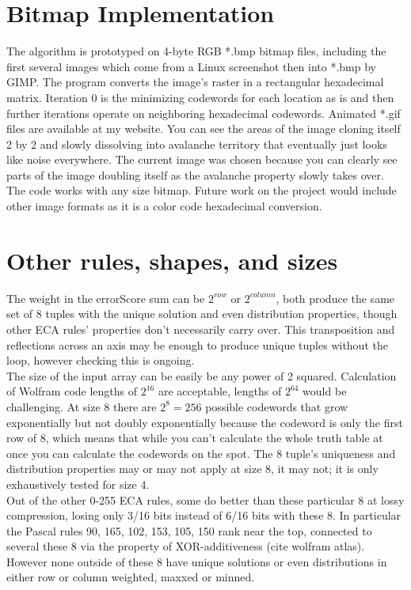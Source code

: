 \documentclass[11pt]{article}
\begin{document}
\section{Bitmap Implementation}

The algorithm is prototyped on 4-byte RGB *.bmp bitmap files, including the first several images which come from a Linux screenshot then into *.bmp by GIMP. The program converts the image's raster in a rectangular hexadecimal matrix. Iteration 0 is the minimizing codewords for each location as is and then further iterations operate on neighboring hexadecimal codewords. Animated *.gif files are available at my website. You can see the areas of the image cloning itself 2 by 2 and slowly dissolving into avalanche territory that eventually just looks like noise everywhere. The current image was chosen because you can clearly see parts of the image doubling itself as the avalanche property slowly takes over. The code works with any size bitmap. Future work on the project would include other image formats as it is a color code hexadecimal conversion. 

\section{Other rules, shapes, and sizes}

The weight in the errorScore sum can be $2^{row}$ or $2^{column}$, both produce the same set of 8 tuples with the unique solution and even distribution properties, though other ECA rules' properties don't necessarily carry over. This transposition and reflections across an axis may be enough to produce unique tuples without the loop, however checking this is ongoing.\\

The size of the input array can be easily be any power of 2 squared. Calculation of Wolfram code lengths of $2^{16}$ are acceptable, lengths of $2^{64}$ would be challenging. At size 8 there are $2^8=256$ possible codewords that grow exponentially but not doubly exponentially because the codeword is only the first row of 8, which means that while you can't calculate the whole truth table at once you can calculate the codewords on the spot. The 8 tuple's uniqueness and distribution properties may or may not apply at size 8, it may not; it is only exhaustively tested for size 4.\\

Out of the other 0-255 ECA rules, some do better than these particular 8 at lossy compression, losing only 3/16 bits instead of 6/16 bits with these 8. In particular the Pascal rules 90, 165, 102, 153, 105, 150 rank near the top, connected to several these 8 via the property of XOR-additiveness (cite wolfram atlas). However none outside of these 8 have unique solutions or even distributions in either row or column weighted, maxxed or minned.\\
\end{document}
